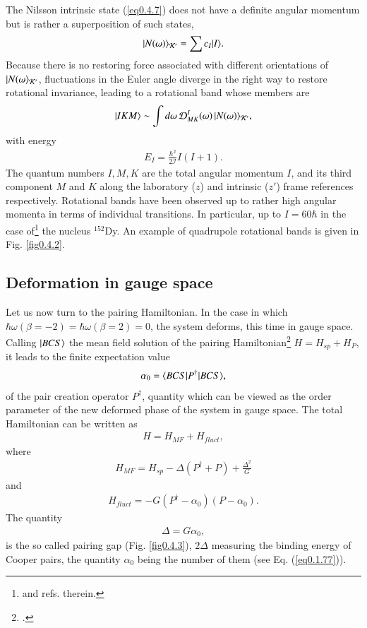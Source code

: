 The Nilsson intrinsic state (\ref{eq0.4.7}) does not have a definite angular momentum but is rather a superposition of such states,
\begin{align}\label{eq0.4.11}
|{N(\omega)} \rangle_{\mathcal K'}=\sum c_I|{I} \rangle.
\end{align}
Because there is no restoring force associated with different orientations of $|{N(\omega} \rangle_{\mathcal K'}$, fluctuations in the Euler angle diverge in the right way to restore rotational invariance, leading to a rotational band whose members are 
\begin{align}\label{eq0.1.47}
|{IKM} \rangle\sim\int d\omega \,\mathcal D^I_{MK}(\omega)\,|{N(\omega)} \rangle_{\mathcal K'},
\end{align}
with energy
\begin{align}\label{eq0.1.48}
E_I=\frac{\hbar^2}{2\mathcal I}I(I+1).
\end{align}
The quantum numbers $I,M,K$ are the total angular momentum $I$, and its third component $M$ and $K$ along the laboratory ($z$) and intrinsic ($z'$) frame references respectively.
Rotational bands have been observed up to rather high angular momenta in terms of individual transitions. In particular, up to $I=60\hbar$ in the case of\footnote{\cite{Nolan:88} and refs. therein.} the nucleus $^{152}$Dy. An example of quadrupole rotational bands  is given in Fig. \ref{fig0.4.2}. 
\subsection{Deformation in gauge space}\label{S1.4.2}
Let us now turn to the pairing Hamiltonian. In the case in which \mbox{$\hbar\omega(\beta=-2)=\hbar\omega(\beta=2)=0$}, the system deforms, this time in gauge space. Calling $|{BCS} \rangle$ the  mean field solution of the pairing Hamiltonian\footnote{\cite{Bardeen:57a,Bardeen:57b}.} $H=H_{sp}+H_{P}$, it leads to the finite expectation value
\begin{align}\label{eq0.4.14}
\alpha_0=\langle {BCS|P^\dagger|BCS} \rangle,
 \end{align}
   of the pair creation operator $P^\dagger$, quantity which can be viewed as the order parameter of the new deformed  phase of the system in gauge space. The total Hamiltonian can be written as
\begin{align}\label{eq0.1.50}
H=H_{MF}+H_{fluct},
\end{align}
where 
\begin{align}\label{eq0.1.51}
H_{MF}=H_{sp}-\Delta(P^\dagger+P)+\frac{\Delta^2}{G}
\end{align}
and
\begin{align}\label{eq0.1.52}
H_{fluct}=-G(P^\dagger-\alpha_0)(P-\alpha_0).
\end{align}
The quantity 
\begin{align}\label{eq0.1.53}
\Delta=G\alpha_0,
\end{align}
is the so called pairing gap (Fig. \ref{fig0.4.3}), $2\Delta$ measuring the binding energy of Cooper pairs, the quantity $\alpha_0$ being the number of them (see Eq. (\ref{eq0.1.77})).

